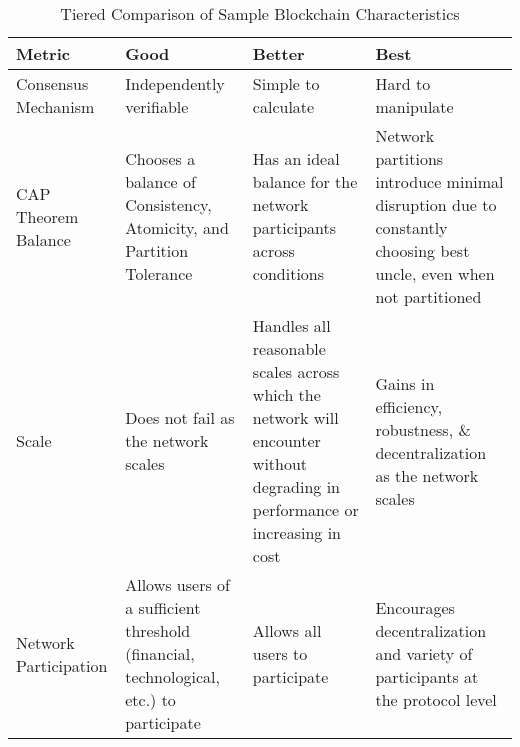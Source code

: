\documentclass{article}
\begin{document}
  {
    \renewcommand{\arraystretch}{1.5}
    \begin{table}[h]
      \centering
      \begin{tabular}{|>{\RaggedRight\arraybackslash}p{3.5cm}|>{\RaggedRight\arraybackslash}p{3.5cm}|>{\RaggedRight\arraybackslash}p{3.5cm}|>{\RaggedRight\arraybackslash}p{3.5cm}|}
        \hline
        \rowcolor{lightgray}
        \textbf{Metric}       & \textbf{Good}                                                                          & \textbf{Better}                                                                                                              & \textbf{Best}                                                                                                    \\
        \hline
        Consensus Mechanism   & Independently verifiable                                                               & Simple to calculate                                                                                                          & Hard to manipulate                                                                                               \\
        \hline
        CAP Theorem Balance   & Chooses a balance of Consistency, Atomicity, and Partition Tolerance                   & Has an ideal balance for the network participants across conditions                                                          & Network partitions introduce minimal disruption due to constantly choosing best uncle, even when not partitioned \\
        \hline
        Scale                 & Does not fail as the network scales                                                    & Handles all reasonable scales across which the network will encounter without degrading in performance or increasing in cost & Gains in efficiency, robustness, \& decentralization as the network scales                                       \\
        \hline
        Network Participation & Allows users of a sufficient threshold (financial, technological, etc.) to participate & Allows all users to participate                                                                                              & Encourages decentralization and variety of participants at the protocol level                                    \\
        \hline
      \end{tabular}
      \caption{Tiered Comparison of Sample Blockchain Characteristics}
    \end{table}
  }
\end{document}
